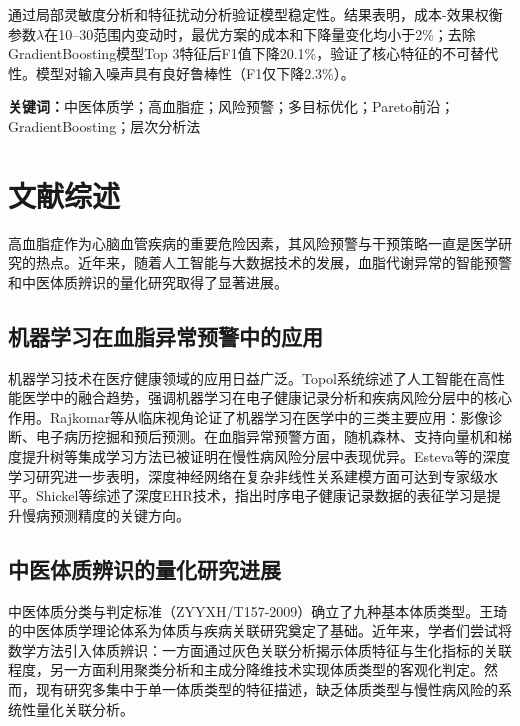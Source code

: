 \documentclass[12pt,a4paper]{ctexart}
\begin{document}
通过局部灵敏度分析和特征扰动分析验证模型稳定性。结果表明，成本-效果权衡参数$\lambda$在10--30范围内变动时，最优方案的成本和下降量变化均小于2\%；去除GradientBoosting模型Top 3特征后F1值下降20.1\%，验证了核心特征的不可替代性。模型对输入噪声具有良好鲁棒性（F1仅下降2.3\%）。

\textbf{关键词：}中医体质学；高血脂症；风险预警；多目标优化；Pareto前沿；GradientBoosting；层次分析法

\newpage

\tableofcontents
\newpage

\section{文献综述}

高血脂症作为心脑血管疾病的重要危险因素，其风险预警与干预策略一直是医学研究的热点。近年来，随着人工智能与大数据技术的发展，血脂代谢异常的智能预警和中医体质辨识的量化研究取得了显著进展。

\subsection{机器学习在血脂异常预警中的应用}

机器学习技术在医疗健康领域的应用日益广泛。Topol\cite{ref16}系统综述了人工智能在高性能医学中的融合趋势，强调机器学习在电子健康记录分析和疾病风险分层中的核心作用。Rajkomar等\cite{ref19}从临床视角论证了机器学习在医学中的三类主要应用：影像诊断、电子病历挖掘和预后预测。在血脂异常预警方面，随机森林\cite{ref10}、支持向量机\cite{ref14}和梯度提升树\cite{ref11}等集成学习方法已被证明在慢性病风险分层中表现优异。Esteva等\cite{ref17}的深度学习研究进一步表明，深度神经网络在复杂非线性关系建模方面可达到专家级水平。Shickel等\cite{ref18}综述了深度EHR技术，指出时序电子健康记录数据的表征学习是提升慢病预测精度的关键方向。

\subsection{中医体质辨识的量化研究进展}

中医体质分类与判定标准（ZYYXH/T157-2009）确立了九种基本体质类型\cite{ref1}。王琦\cite{ref8}的中医体质学理论体系为体质与疾病关联研究奠定了基础。近年来，学者们尝试将数学方法引入体质辨识：一方面通过灰色关联分析\cite{ref12}揭示体质特征与生化指标的关联程度，另一方面利用聚类分析和主成分降维技术实现体质类型的客观化判定。然而，现有研究多集中于单一体质类型的特征描述，缺乏体质类型与慢性病风险的系统性量化关联分析。
\end{document}
